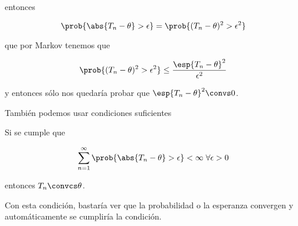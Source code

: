 \documentclass{apuntes}
\begin{document}
entonces

\[ \prob{\abs{T_n - \theta} > \epsilon} = \prob{(T_n - \theta)^2 > \epsilon^2} \]

que por Markov tenemos que

\[ \prob{(T_n - \theta)^2 > \epsilon^2} \leq \frac{\esp{T_n - \theta}^2}{\epsilon^2} \]

y entonces sólo nos quedaría probar que $\esp{T_n - \theta}^2 \convs 0$.

También podemos usar condiciones suficientes

\begin{theorem} Si se cumple que

\[ \sum_{n=1}^\infty \prob{\abs{T_n-\theta} > \epsilon} < \infty\;\forall\epsilon > 0 \]

entonces $T_n \convcs \theta$.
\end{theorem}

Con esta condición, bastaría ver que la probabilidad o la esperanza convergen y automáticamente se cumpliría la condición.
\end{document}
